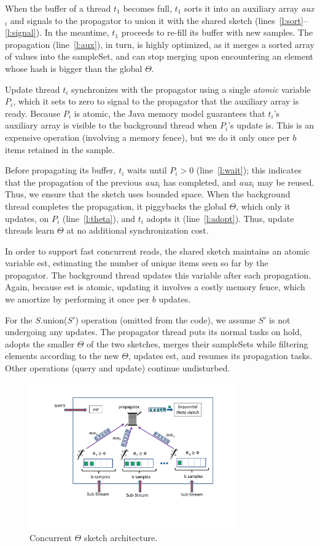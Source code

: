 When the buffer of a thread $t_1$ becomes full, $t_1$ sorts it
into an auxiliary array \emph{aux$_i$} and signals to the propagator  to union
it with the shared sketch (lines~\ref{l:sort}--\ref{l:signal}).
In the meantime, $t_1$ proceeds to re-fill its buffer with new samples.
The propagation  (line~\ref{l:aux}), in turn,  is highly optimized, as it merges a sorted array of 
values into the sampleSet, and can stop merging upon encountering 
an element whose hash is bigger than the global $\Theta$.

Update thread $t_i$ synchronizes with the propagator using a 
single \emph{atomic} variable $P_i$, which it sets to zero 
to signal to the propagator that the auxiliary array is ready.  
Because $P_i$ is  atomic, the Java memory model
guarantees that $t_i$'s auxiliary array is visible to
the background thread when $P_i$'s update is.
This is  an expensive operation (involving a memory fence),  
but we do it only once per $b$ items retained in the sample.

Before propagating its buffer, $t_i$ waits
until $P_i > 0$  (line~\ref{l:wait}); 
this indicates that the propagation of the previous \emph{aux}$_i$
 has completed, and  \emph{aux}$_i$ may
be reused. Thus, we  ensure that the sketch uses bounded space.
%
When the background thread completes the propagation, 
it piggybacks the global $\Theta$, which only it updates, on $P_i$  (line~\ref{l:theta}), 
and $t_i$ adopts it  (line~\ref{l:adopt}). Thus, update threads   learn $\Theta$ at no
additional synchronization cost. 

In order to support  fast concurrent reads, the shared sketch
maintains an atomic variable est, estimating the number of
 unique items seen so far by the propagator.
The background thread updates this variable after each propagation.
Again, because est is atomic, updating it involves a costly memory fence, which we amortize by performing it once per $b$ updates. 

For the $S$.union($S'$) operation (omitted from the code), 
we assume $S'$ is not undergoing any updates. 
The propagator thread puts its normal tasks on hold, 
 adopts the smaller $\Theta$ of the two sketches, merges their sampleSets while filtering elements according to the new $\Theta$, updates est, and resumes its 
 propagation tasks. Other operations (query and update) continue undisturbed.


\begin{figure}[tb]
    \includegraphics[width=3.5in]{images/concTheta.pdf}
    \caption{Concurrent $\Theta$ sketch architecture.}
    \label{fig:concurrentTheta}
\end{figure}
